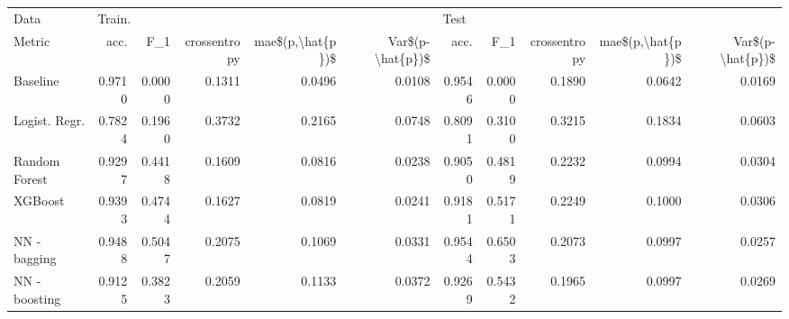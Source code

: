 \begin{tabular}{lrrrrrrrrrr}
\toprule
Data & \multicolumn{5}{l}{Train.} & \multicolumn{5}{l}{Test} \\
Metric &    acc. &     F\_1 & crossentropy & mae\$(p,\textbackslash hat\{p\})\$ & Var\$(p-\textbackslash hat\{p\})\$ &    acc. &     F\_1 & crossentropy & mae\$(p,\textbackslash hat\{p\})\$ & Var\$(p-\textbackslash hat\{p\})\$ \\
\midrule
Baseline      &  0.9710 &  0.0000 &       0.1311 &           0.0496 &           0.0108 &  0.9546 &  0.0000 &       0.1890 &           0.0642 &           0.0169 \\
Logist. Regr. &  0.7824 &  0.1960 &       0.3732 &           0.2165 &           0.0748 &  0.8091 &  0.3100 &       0.3215 &           0.1834 &           0.0603 \\
Random Forest &  0.9297 &  0.4418 &       0.1609 &           0.0816 &           0.0238 &  0.9050 &  0.4819 &       0.2232 &           0.0994 &           0.0304 \\
XGBoost       &  0.9393 &  0.4744 &       0.1627 &           0.0819 &           0.0241 &  0.9181 &  0.5171 &       0.2249 &           0.1000 &           0.0306 \\
NN - bagging  &  0.9488 &  0.5047 &       0.2075 &           0.1069 &           0.0331 &  0.9544 &  0.6503 &       0.2073 &           0.0997 &           0.0257 \\
NN - boosting &  0.9125 &  0.3823 &       0.2059 &           0.1133 &           0.0372 &  0.9269 &  0.5432 &       0.1965 &           0.0997 &           0.0269 \\
\bottomrule
\end{tabular}
